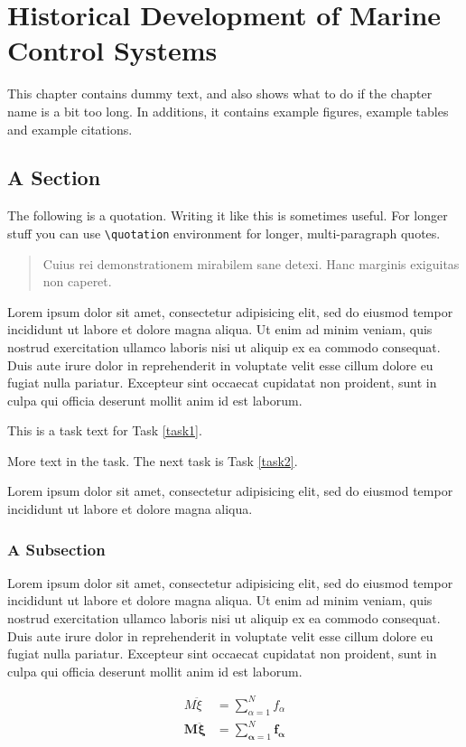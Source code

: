 \chapter[Historical Development of Marine Control Systems][Historical Development]{Historical Development of Marine Control Systems}

This chapter contains dummy text, and also shows what to do if the chapter name is a bit too long. In additions, it contains example figures, example tables and example citations. 

\section{A Section}
The following is a quotation. Writing it like this is sometimes useful. For longer stuff you can use \verb?\quotation? environment for longer, multi-paragraph quotes. 
\begin{quote}
Cuius rei demonstrationem mirabilem sane detexi. Hanc marginis exiguitas non caperet.\cite{sinus}
\end{quote}
Lorem ipsum dolor sit amet, consectetur \cite{lyapunov} adipisicing elit, sed do eiusmod tempor incididunt ut labore et dolore magna aliqua. Ut enim ad minim veniam, quis nostrud exercitation ullamco laboris nisi ut aliquip ex ea commodo consequat. Duis aute irure dolor in reprehenderit in voluptate velit esse cillum dolore eu fugiat nulla pariatur. Excepteur sint occaecat cupidatat non proident, sunt in culpa qui officia deserunt mollit anim id est \cite{brockett} laborum.

\begin{task}\label{task1}
This is a task text for Task \ref{task1}.

More text in the task. The next task is Task \ref{task2}. 
\end{task}

Lorem ipsum dolor sit amet, consectetur adipisicing elit, sed do eiusmod tempor incididunt ut labore et dolore magna aliqua. 

\subsection{A Subsection}
\begin{task}\label{task2}
Lorem ipsum dolor sit amet, consectetur adipisicing elit, sed do eiusmod tempor incididunt ut labore et dolore magna aliqua. Ut enim ad minim veniam, quis nostrud exercitation ullamco laboris nisi ut aliquip ex ea commodo consequat. Duis aute irure dolor in reprehenderit in voluptate velit esse cillum dolore eu fugiat nulla pariatur. Excepteur sint occaecat cupidatat non proident, sunt in culpa qui officia deserunt mollit anim id est laborum.

\begin{align}
M\ddot{\xi}&=\sum_{\alpha=1}^N f_\alpha \\
\mathbf{M}\ddot{\boldsymbol{\xi}}&=\sum_{\mathbf{\alpha}=1}^N \boldsymbol{f}_{\mathbf{\alpha}} \nonumber
\end{align}
\end{task}

